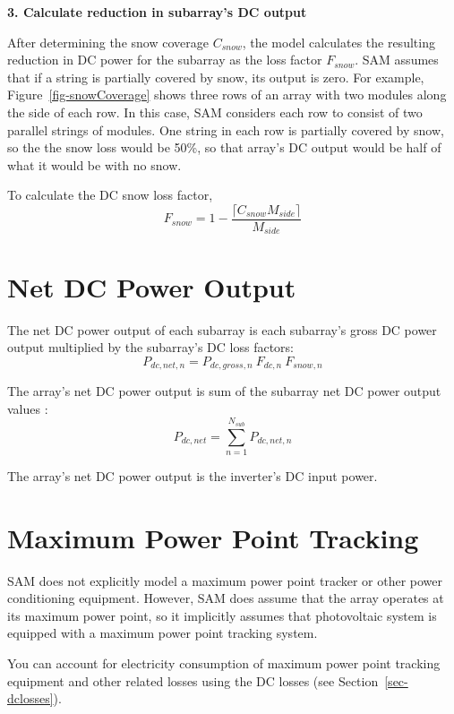\documentclass[12pt,letterpaper]{article}
\begin{document}
\textbf{3. Calculate reduction in subarray's DC output}

After determining the snow coverage $C_{snow}$, the model calculates the resulting reduction in DC power for the subarray as the loss factor $F_{snow}$. SAM assumes that if a string is partially covered by snow, its output is zero. For example, Figure~\ref{fig-snowCoverage} shows three rows of an array with two modules along the side of each row. In this case, SAM considers each row to consist of two parallel strings of modules. One string in each row is partially covered by snow, so the the snow loss would be 50\%, so that array's DC output would be half of what it would be with no snow.

To calculate the DC snow loss factor,
\begin{equation}
F_{snow} = 1-\frac{\lceil C_{snow}M_{side}\rceil}{M_{side}}
\end{equation}

\section{Net DC Power Output}

The net DC power output of each subarray is each subarray's gross DC power output multiplied by the subarray's DC loss factors:
\begin{equation}
P_{dc,net,n} = P_{dc,gross,n}~F_{dc,n}~F_{snow,n}
\end{equation}

The array's net DC power output is sum of the subarray net DC power output values :
\begin{equation}
P_{dc,net} = \sum_{n=1}^{N_{sub}} P_{dc,net,n}
\end{equation}

The array's net DC power output is the inverter's DC input power.

\section{Maximum Power Point Tracking}

SAM does not explicitly model a maximum power point tracker or other power conditioning equipment. However,  SAM does assume that the array operates at its maximum power point, so it implicitly assumes that photovoltaic system is equipped with a maximum power point tracking system. 

You can account for electricity consumption of maximum power point tracking equipment and other related losses using the DC losses (see Section~\ref{sec-dclosses}).
\end{document}
